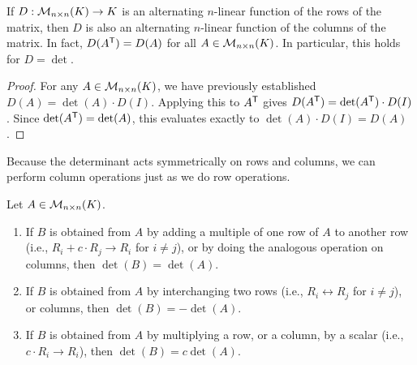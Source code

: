 \begin{corollary}
  \label{cor:det_columns}
  If $D : \mathcal{M}_{n \times n}(K) \to K$ is an alternating $n$-linear function of the rows of the matrix, then $D$ is also an alternating $n$-linear function of the columns of the matrix. In fact, $D(A^{\mathsf{T}}) = D(A)$ for all $A \in \mathcal{M}_{n \times n}(K)$. In particular, this holds for $D = \det$.
\end{corollary}

\begin{proof}
  For any $A \in \mathcal{M}_{n \times n}(K)$, we have previously established $D(A) = \det(A) \cdot D(I)$. Applying this to $A^{\mathsf{T}}$ gives $D(A^{\mathsf{T}}) = \det(A^{\mathsf{T}}) \cdot D(I)$. Since $\det(A^{\mathsf{T}}) = \det(A)$, this evaluates exactly to $\det(A) \cdot D(I) = D(A)$.
\end{proof}

Because the determinant acts symmetrically on rows and columns, we can perform column operations just as we do row operations.

\begin{theorem}
  \label{thm:row_operations}
  Let $A \in \mathcal{M}_{n \times n}(K)$.
  \begin{enumerate}[label=\textbf{(\alph*)}]
    \item If $B$ is obtained from $A$ by adding a multiple of one row of $A$ to another row (i.e., $R_i + c \cdot R_j \to R_i$ for $i \neq j$), or by doing the analogous operation on columns, then $\det(B) = \det(A)$.
    \item If $B$ is obtained from $A$ by interchanging two rows (i.e., $R_i \leftrightarrow R_j$ for $i \neq j$), or columns, then $\det(B) = -\det(A)$.
    \item If $B$ is obtained from $A$ by multiplying a row, or a column, by a scalar (i.e., $c \cdot R_i \to R_i$), then $\det(B) = c \det(A)$.
  \end{enumerate}
\end{theorem}

